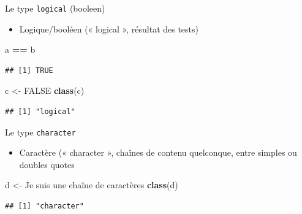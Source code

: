 \documentclass[
  ignorenonframetext,
]{beamer}
\newenvironment{Shaded}{\begin{snugshade}}{\end{snugshade}}
\newcommand{\ConstantTok}[1]{\textcolor[rgb]{0.56,0.35,0.01}{#1}}
\newcommand{\FunctionTok}[1]{\textcolor[rgb]{0.13,0.29,0.53}{\textbf{#1}}}
\newcommand{\NormalTok}[1]{#1}
\newcommand{\OtherTok}[1]{\textcolor[rgb]{0.56,0.35,0.01}{#1}}
\newcommand{\SpecialCharTok}[1]{\textcolor[rgb]{0.81,0.36,0.00}{\textbf{#1}}}
\newcommand{\StringTok}[1]{\textcolor[rgb]{0.31,0.60,0.02}{#1}}
\providecommand{\tightlist}{%
  \setlength{\itemsep}{0pt}\setlength{\parskip}{0pt}}
\begin{document}
\begin{frame}[fragile]{Le type \texttt{logical} (booleen)}
\protect\hypertarget{le-type-logical-booleen}{}
\begin{itemize}
\tightlist
\item
  Logique/booléen (« logical », résultat des tests)
\end{itemize}

\tiny

\begin{Shaded}
\begin{Highlighting}[]
\NormalTok{a }\SpecialCharTok{==}\NormalTok{ b}
\end{Highlighting}
\end{Shaded}

\begin{verbatim}
## [1] TRUE
\end{verbatim}

\normalsize

\tiny

\begin{Shaded}
\begin{Highlighting}[]
\NormalTok{c }\OtherTok{\textless{}{-}} \ConstantTok{FALSE}
\FunctionTok{class}\NormalTok{(c)}
\end{Highlighting}
\end{Shaded}

\begin{verbatim}
## [1] "logical"
\end{verbatim}

\normalsize
\end{frame}

\begin{frame}[fragile]{Le type \texttt{character}}
\protect\hypertarget{le-type-character}{}
\begin{itemize}
\tightlist
\item
  Caractère (« character », chaînes de contenu quelconque, entre simples
  ou doubles quotes
\end{itemize}

\tiny

\begin{Shaded}
\begin{Highlighting}[]
\NormalTok{d }\OtherTok{\textless{}{-}} \StringTok{\textquotesingle{}Je suis une chaîne de caractères\textquotesingle{}}
\FunctionTok{class}\NormalTok{(d)}
\end{Highlighting}
\end{Shaded}

\begin{verbatim}
## [1] "character"
\end{verbatim}

\normalsize
\end{frame}
\end{document}
